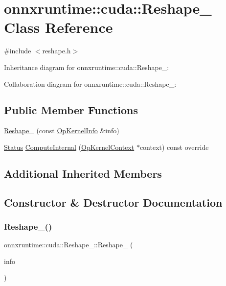 \hypertarget{classonnxruntime_1_1cuda_1_1Reshape__1}{}\section{onnxruntime\+:\+:cuda\+:\+:Reshape\+\_ Class Reference}
\label{classonnxruntime_1_1cuda_1_1Reshape__1}


{\ttfamily \#include $<$reshape.\+h$>$}



Inheritance diagram for onnxruntime\+:\+:cuda\+:\+:Reshape\+\_\+:


Collaboration diagram for onnxruntime\+:\+:cuda\+:\+:Reshape\+\_\+:
\subsection*{Public Member Functions}
\begin{DoxyCompactItemize}
\item 
\mbox{\hyperlink{classonnxruntime_1_1cuda_1_1Reshape__1_ae62ce8064f509b11a739d293e11618e6}{Reshape\+\_}} (const \mbox{\hyperlink{classonnxruntime_1_1OpKernelInfo}{Op\+Kernel\+Info}} \&info)
\item 
\mbox{\hyperlink{classonnxruntime_1_1common_1_1Status}{Status}} \mbox{\hyperlink{classonnxruntime_1_1cuda_1_1Reshape__1_ae2c8570939f5fb4640bda8f4961fff42}{Compute\+Internal}} (\mbox{\hyperlink{classonnxruntime_1_1OpKernelContext}{Op\+Kernel\+Context}} $\ast$context) const override
\end{DoxyCompactItemize}
\subsection*{Additional Inherited Members}


\subsection{Constructor \& Destructor Documentation}
\mbox{\label{classonnxruntime_1_1cuda_1_1Reshape__1_ae62ce8064f509b11a739d293e11618e6}} 
\subsubsection{\texorpdfstring{Reshape\+\_()}{Reshape\_1()}}
{\footnotesize\ttfamily onnxruntime\+::cuda\+::\+Reshape\+\_\+::\+Reshape\+\_ (\begin{DoxyParamCaption}\item[{const \mbox{\hyperlink{classonnxruntime_1_1OpKernelInfo}{Op\+Kernel\+Info}} \&}]{info }\end{DoxyParamCaption})\hspace{0.3cm}{\ttfamily [inline]}}



